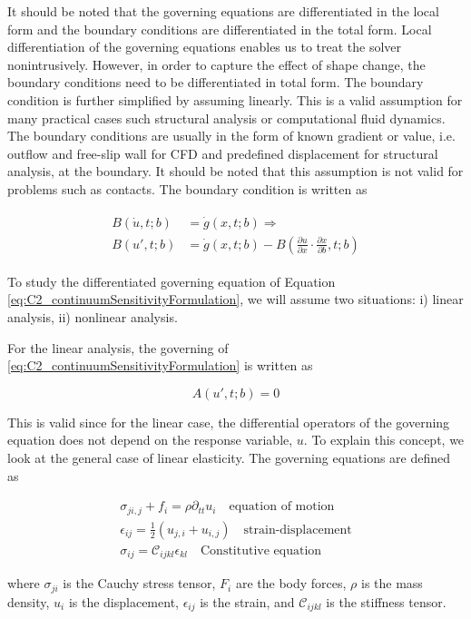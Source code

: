 It should be noted that the governing equations are differentiated in the local form and the boundary conditions are differentiated in the total form. Local differentiation of the governing equations enables us to treat the solver nonintrusively. However, in order to capture the effect of shape change, the boundary conditions need to be differentiated in total form. The boundary condition is further simplified by assuming linearly. This is a valid assumption for many practical cases such structural analysis or computational fluid dynamics. The boundary conditions are usually in the form of known gradient or value, i.e. outflow and free-slip wall for CFD and predefined displacement for structural analysis, at the boundary. It should be noted that this assumption is not valid for problems such as contacts. The boundary condition is written as

\begin{align}\label{eq:C2_linearSAboundaryCondtions}
\begin{split}
	B(\dot{u}, t; b) &= \dot{g}(x, t; b) \Rightarrow \\
	B(u', t; b) &= \dot{g}(x, t; b) - B(\frac{\partial u}{\partial x} \cdot \frac{\partial x}{\partial b}, t; b)
\end{split}
\end{align}

To study the differentiated governing equation of Equation \eqref{eq:C2_continuumSensitivityFormulation}, we will assume two situations: i) linear analysis, ii) nonlinear analysis.

For the linear analysis, the governing  of \eqref{eq:C2_continuumSensitivityFormulation} is written as

\begin{equation}\label{eq:C2_linearSAgoverningEquation}
	A(u', t; b) = 0 
\end{equation}

This is valid since for the linear case, the differential operators of the governing equation does not depend on the response variable, $u$. To explain this concept, we look at the general case of linear elasticity. The governing equations are defined as

\begin{subequations}
\begin{align*}
	\sigma_{ji,j} + f_i = \rho \partial_{tt} u_i \quad \text{equation of motion} \\
	\epsilon_{ij} = \frac{1}{2} \left( u_{j,i} + u_{i,j} \right) \quad \text{strain-displacement} \\
	\sigma_{ij} = \mathcal{C}_{ijkl} \epsilon_{kl} \quad \text{Constitutive equation}
\end{align*}
\end{subequations}

where $\sigma_{ji}$ is the Cauchy stress tensor, $F_i$ are the body forces, $\rho$ is the mass density, $u_i$ is the displacement, $\epsilon_{ij}$ is the strain, and $\mathcal{C}_{ijkl}$ is the stiffness tensor. 